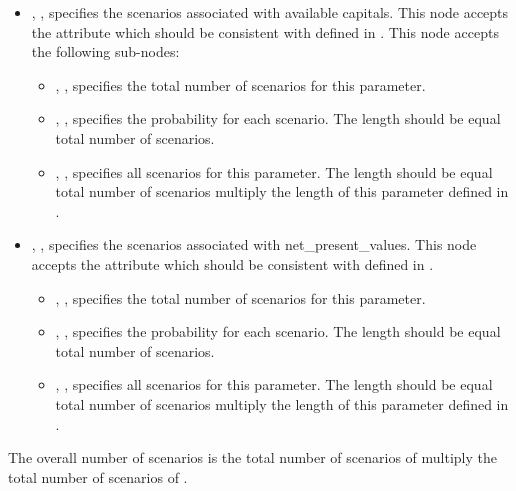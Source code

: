\begin{itemize}
  \item {}, , specifies the scenarios
  associated with available capitals. This node accepts the attribute  which
  should be consistent with  defined in .
  This node accepts the following sub-nodes:
  \begin{itemize}
    \item {}, , specifies the total
    number of scenarios for this parameter.
    \item {}, ,
    specifies the probability for each scenario. The length should be equal total number of
    scenarios.
    \item {}, ,
    specifies all scenarios for this parameter. The length should be equal total number
    of scenarios multiply the length of this parameter defined in .
  \end{itemize}

  \item {}, , specifies the scenarios
  associated with net\_present\_values. This node accepts the attribute  which
  should be consistent with  defined in .
  \begin{itemize}
    \item {}, , specifies the total
    number of scenarios for this parameter.
    \item {}, ,
    specifies the probability for each scenario. The length should be equal total number of
    scenarios.
    \item {}, ,
    specifies all scenarios for this parameter. The length should be equal total number
    of scenarios multiply the length of this parameter defined in .
  \end{itemize}
\end{itemize}

The overall number of scenarios is the total number of scenarios of 
multiply the total number of scenarios of .

